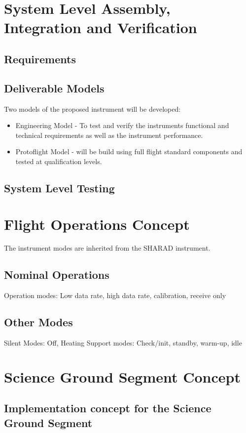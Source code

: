 \section{System Level Assembly, Integration and Verification}
%
%
\subsection{Requirements}
\subsection{Deliverable Models}
%
Two models of the proposed instrument will be developed:
\begin{itemize}
\item Engineering Model - To test and verify the instruments functional and technical requirements as well as the instrument performance.\\
\item Protoflight Model - will be build using full flight standard components and tested at qualification levels.
\end{itemize}
%
\subsection{System Level Testing}
%
\section{Flight Operations Concept}
%
The instrument modes are inherited from the SHARAD instrument\cite{SHARAD_ppt}.
%
\subsection{Nominal Operations}
%
Operation modes: Low data rate, high data rate, calibration, receive only
%
\subsection{Other Modes}
%
Silent Modes: Off, Heating
Support modes: Check/init, standby, warm-up, idle
%
%
%
\section{Science Ground Segment Concept}
\subsection{Implementation concept for the Science Ground Segment}
